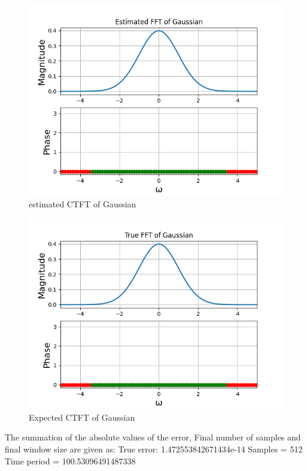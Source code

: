 \documentclass{article}
\begin{document}
\begin{figure}[h!]
\centering
\includegraphics[scale=0.6]{Ass8_Figure_8.png}
\caption{estimated CTFT of Gaussian}
\label{fig:universe}
\end{figure}

\begin{figure}[h!]
\centering
\includegraphics[scale=0.6]{Ass8_Figure9.png}
\caption{Expected CTFT of Gaussian}
\label{fig:universe}
\end{figure}
The summation of the absolute values of the error, Final number of samples and final window size are given as:\newline
True error: 1.472553842671434e-14\newline
Samples = 512\newline 
Time period = 100.53096491487338\newline
\end{document}
